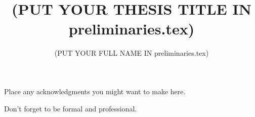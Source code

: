 

\title{(PUT YOUR THESIS TITLE IN preliminaries.tex)}
\author{(PUT YOUR FULL NAME IN preliminaries.tex)}







\firstThreePages


\Acknowledgments

Place any acknowledgments you might want to make here.

Don't forget to be formal and professional.



